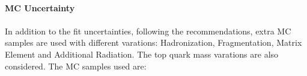 


\paragraph{\ttbar MC Uncertainty}
\label{sec:b-tagging-unc}
\hspace{0.1mm}\newline

\paragraph{}
In addition to the \ttbar fit uncertainties, following the recommendations, extra \ttbar MC samples are used with different varations: Hadronization, Fragmentation, Matrix Element and Additional Radiation. The top quark mass varations are also considered. The MC samples used are:

